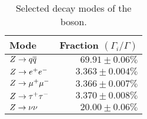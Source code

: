 \begin{table}[h]
    \centering
    \begin{center}
        \begin{tabular}{@{}l r@{}}
            \toprule
            Mode         & Fraction $\left( \Gamma_{i} / \Gamma \right)$ \\
            \midrule
            $Z \to q \overline{q}$     & $69.91 \pm 0.06\%$ \\
            $Z \to e^{+} e^{-}$     & $3.363 \pm 0.004\%$ \\
            $Z \to \mu^{+} \mu^{-}$   & $3.366 \pm 0.007\%$ \\
            $Z \to \tau^{+} \tau^{-}$ & $3.370 \pm 0.008\%$ \\
            $Z \to \nu \nu$   & $20.00 \pm 0.06\%$ \\
            \bottomrule
        \end{tabular}
        \caption{
            Selected decay modes of the \Z boson.
        }
        \label{table:z_decays}
    \end{center}
\end{table}
